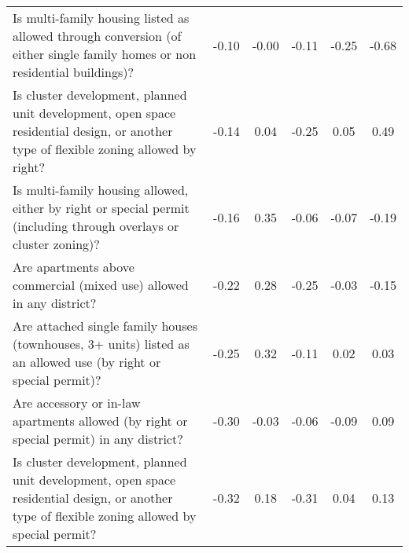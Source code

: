 \begin{table}
\begin{tabular}{p{13cm}ccccc}
Is multi-family housing listed as allowed through conversion (of either single family homes or non residential buildings)? & -0.10 & -0.00 & -0.11 & -0.25 & -0.68 \\
Is cluster development, planned unit development, open space residential design, or another type of flexible zoning allowed by right? & -0.14 & 0.04 & -0.25 & 0.05 & 0.49 \\
Is multi-family housing allowed, either by right or special permit (including through overlays or cluster zoning)? & -0.16 & 0.35 & -0.06 & -0.07 & -0.19 \\
Are apartments above commercial (mixed use) allowed in any district? & -0.22 & 0.28 & -0.25 & -0.03 & -0.15 \\
Are attached single family houses (townhouses, 3+ units) listed as an allowed use (by right or special permit)? & -0.25 & 0.32 & -0.11 & 0.02 & 0.03 \\
Are accessory or in-law apartments allowed (by right or special permit) in any district? & -0.30 & -0.03 & -0.06 & -0.09 & 0.09 \\
Is cluster development, planned unit development, open space residential design, or another type of flexible zoning allowed by special permit? & -0.32 & 0.18 & -0.31 & 0.04 & 0.13 \\
\bottomrule
\end{tabular}
\end{table}
